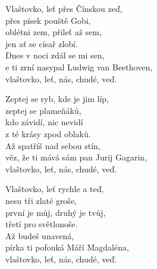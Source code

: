
\ve{}
Vlaštovko, leť přes Čínskou zeď,\\
přes písek pouště Gobi, \\
oblétni zem, přileť až sem,\\
jen ať se císař zlobí. \\
Dnes v noci zdál se mi sen,\\
e ti zrní nasypal Ludwig van Beethoven,\\
vlaštovko, leť, nás, chudé, veď. 

\ve{}
Zeptej se ryb, kde je jim líp,\\
zeptej se plameňáků,\\
kdo závidí, nic nevidí\\
z té krásy zpod oblaků.\\
Až spatříš nad sebou stín,\\
věz, že ti mává sám pan Jurij Gagarin,\\
vlaštovko, leť, nás, chudé, veď.

\ve{}
Vlaštovko, leť rychle a teď,\\
nesu tři zlaté groše,\\
první je můj, druhý je tvůj,\\
třetí pro světlonoše.\\
Až budeš unavená,\\
pírka ti pofouká Máří Magdaléna,\\
vlaštovko, leť, nás, chudé, veď.

\esong{}
